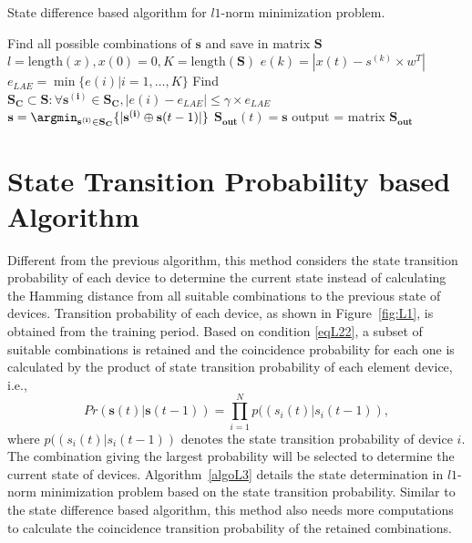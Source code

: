 \begin{algorithm}
\caption{State difference based algorithm for $l1$-norm minimization problem.}\label{algoL2}
\begin{algorithmic}[1]
\State Find all possible combinations of $\mathbf{s}$ and save in matrix $\mathbf{S}$
\State $l = \text{length}(x),x(0) = 0,K=\text{length}(\mathbf{S})$
	        \State $e(k) = |x(t)-s^{(k)}\times w^T|$
	    \EndFor
		\State $e_{LAE} = \min{\{e(i)|i=1,\ldots,K\}}$
		\State Find $\mathbf{S_C}\subset \mathbf{S}: \forall \mathbf{s^{(i)}}\in \mathbf{S_C},|e(i)-e_{LAE}|\leq \gamma \times e_{LAE}$
		\State $\mathbf{s} = \argmin_{\mathbf{s^{(i)}}\in \mathbf{S_C}}{\{|\mathbf{s^{(i)}}\oplus \mathbf{s}(t-1)|\}}$
		\State $\mathbf{S_{out}}(t) = \mathbf{s}$ 
	\EndFor
\State output = matrix $\mathbf{S_{out}}$
\EndFunction
\end{algorithmic}
\end{algorithm}






\section{State Transition Probability based Algorithm}\label{proba}
Different from the previous algorithm, this method considers the state transition probability of each device to determine the current state instead of calculating the Hamming distance from all suitable combinations to the previous state of devices. Transition probability of each device, as shown in Figure~\ref{fig:L1}, is obtained from the training period. Based on condition \eqref{eqL22}, a subset of suitable combinations is retained and the coincidence probability for each one is calculated by the product of state transition probability of each element device, i.e.,
\begin{equation}\label{eqL5}
Pr(\mathbf{s}(t)|\mathbf{s}(t-1)) = \prod_{i=1}^{N}{p((s_i(t)|s_i(t-1))},
\end{equation}
where $p((s_i(t)|s_i(t-1))$ denotes the state transition probability of device $i$. The combination giving the largest probability will be selected to determine the current state of devices. Algorithm~\ref{algoL3} details the state determination in $l1$-norm minimization problem based on the state transition probability.
Similar to the state difference based algorithm, this method also needs more computations to calculate the coincidence transition probability of the retained combinations.

